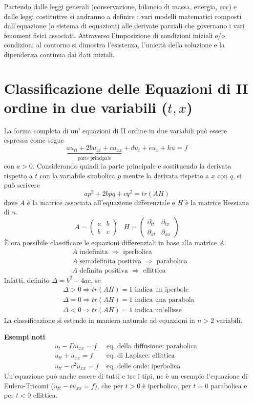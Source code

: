 Partendo dalle leggi generali (conservazione, bilancio di massa, energia, ecc) e dalle leggi costitutive si andranno a definire
i vari modelli matematici composti dall'equazione (o sistema di equazioni) alle derivate parziali che governano i vari fenomeni fisici associati.
Attraverso l'imposizione di condizioni iniziali e/o condizioni al contorno si dimostra l'esistenza, l'unicit\`a della soluzione e la dipendenza continua
dai dati iniziali.
\section{Classificazione delle Equazioni di II ordine in due variabili ($t,x$)}
La forma completa di un' equazioni di II ordine in due variabili pu\`o essere espressa come segue
\[
	\underbrace{au_{tt}+2bu_{xt}+cu_{xx}}_\text{parte principale} + 
	du_t + eu_x + hu = f
\]
con $a>0$.
Considerando quindi la parte principale e sostituendo la derivata rispetto a $t$ con la variabile simbolica $p$ mentre la derivata 
rispetto a $x$ con $q$, si pu\`o scrivere
\[
	ap^2 + 2bpq + cq^2 = tr(AH)
\]
dove $A$ \`e la matrice associata all'equazione differenziale e $H$ \`e la matrice Hessiana di $u$.
\[
A=
 \begin{pmatrix}
  a & b \\
  b & c
 \end{pmatrix}
\;\;\;
H=
 \begin{pmatrix}
  \partial_{tt} & \partial_{tx} \\
  \partial_{xt} & \partial_{xx}
 \end{pmatrix}
\]
\`E ora possibile classificare le equazioni differenziali in base alla matrice $A$.
%
\begin{align*}
& A \mbox{ indefinita }  \Rightarrow  \mbox{ iperbolica}\\
& A \mbox{ semidefinita positiva }  \Rightarrow  \mbox{ parabolica}\\
& A \mbox{ definita positiva }  \Rightarrow  \mbox{ ellittica}
\end{align*}
%
Infatti, definito $\Delta=b^2-4ac$, se
%
\begin{align*}
& \Delta>0 \Rightarrow tr(AH)=1 \mbox{ indica un iperbole }\\
& \Delta=0 \Rightarrow tr(AH)=1 \mbox{ indica una parabola }\\
& \Delta<0 \Rightarrow tr(AH)=1 \mbox{ indica un'ellisse }
\end{align*}
%
La classificazione si estende in maniera naturale ad equazioni in $n>2$ variabili.

{\bf Esempi noti}
\[
\begin{array}{ll}
	u_t - Du_{xx}=f &\mbox{ eq. della diffusione: parabolica }\\
	u_{tt} + u_{xx}=f &\mbox{ eq. di Laplace: ellittica }\\
	u_{tt} - c^2 u_{xx}=f &\mbox{ eq. delle onde: iperbolica }
\end{array}
\]
Un'equazione pu\`o anche essere di tutti e tre i tipi, ne \`e un esempio l'equazione di Eulero-Tricomi ($u_{tt}-tu_{xx}=f$), che per $t>0$ \`e iperbolica,
per $t=0$ parabolica e per $t<0$ ellittica. 